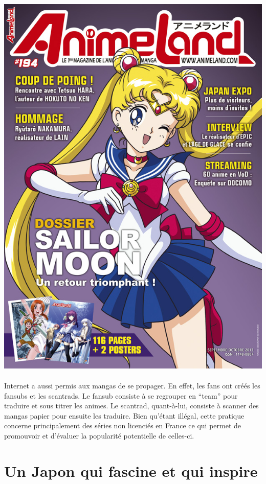 \begin{center}
	\includegraphics[scale=0.8]{animeland.jpg}
\end{center}

\paragraph{} Internet a aussi permis aux mangas de se propager. En effet, les
fans ont créés les fansubs et les scantrads. Le fansub consiste à se regrouper
en ``team'' pour traduire et sous titrer les animes. Le scantrad, quant-à-lui,
consiste à scanner des mangas papier pour ensuite les traduire. Bien qu'étant
illégal, cette pratique concerne principalement des séries non licenciés en
France ce qui permet de promouvoir et d'évaluer la popularité potentielle de
celles-ci.

\section{Un Japon qui fascine et qui inspire}

